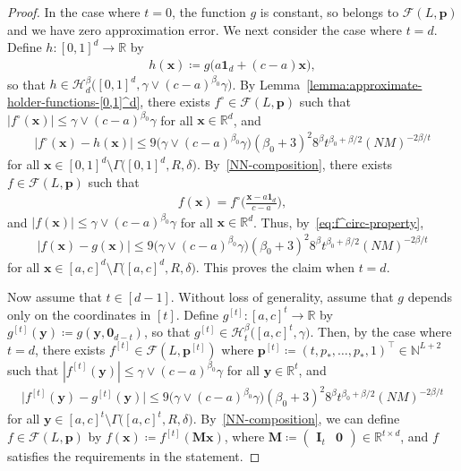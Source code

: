 \documentclass[12pt]{article}
\begin{document}
\begin{proof}
    In the case where $t=0$, the function $g$ is constant, so belongs to $\mathcal{F}(L,\bm p)$ and we have zero approximation error.
    We next consider the case where $t=d$.
    Define $h:[0,1]^d \to \mathbb{R}$ by
    \begin{align*}
        h(\bm x) \coloneqq g\bigl(a\bm{1}_d + (c-a)\bm x  \bigr),
    \end{align*}
    so that $h\in\mathcal{H}_d^{\beta}\bigl([0,1]^d, \gamma \vee (c-a)^{\beta_0}\gamma\bigr)$. By Lemma~\ref{lemma:approximate-holder-functions-[0,1]^d}, there exists $f^\circ \in\mathcal{F}(L,\bm p)$ such that $|f^\circ(\bm x)| \leq \gamma \vee (c-a)^{\beta_0}\gamma$ for all $\bm x \in \mathbb{R}^d$, and
    \begin{align}
        |f^\circ(\bm x) - h(\bm x)| \leq 9 \bigl(\gamma \vee (c-a)^{\beta_0}\gamma\bigr) (\beta_0+3)^2 8^{\beta} t^{\beta_0+\beta/2} (NM)^{-2\beta/t} \label{eq:f^circ-property}
    \end{align}
    for all $\bm x \in [0,1]^d \setminus \Gamma \bigl([0,1]^d,R,\delta\bigr)$. 
    By~\ref{NN-composition}, there exists $f \in \mathcal{F}(L,\bm p)$ such that 
    \begin{align*}
        f(\bm x) = f^\circ\biggl(\frac{\bm x - a\bm{1}_d}{c-a}\biggr),
    \end{align*}
    and $|f(\bm x)| \leq \gamma \vee (c-a)^{\beta_0}\gamma$ for all $\bm x \in \mathbb{R}^d$.
    Thus, by~\eqref{eq:f^circ-property},
    \begin{align*}
        |f(\bm x) - g(\bm x)| \leq 9 \bigl(\gamma \vee (c-a)^{\beta_0}\gamma\bigr) (\beta_0+3)^2 8^{\beta} t^{\beta_0+\beta/2} (NM)^{-2\beta/t}
    \end{align*}
    for all $\bm x \in [a,c]^d \setminus \Gamma\bigl([a,c]^d, R, \delta\bigr)$. This proves the claim when $t=d$.

    \medskip Now assume that $t\in[d-1]$. Without loss of generality, assume that $g$ depends only on the coordinates in $[t]$. Define $g^{[t]} : [a,c]^t \to \mathbb{R}$ by $g^{[t]}(\bm y) \coloneqq g(\bm y, \bm 0_{d-t})$, so that $g^{[t]} \in \mathcal{H}_t^{\beta}\bigl([a,c]^t, \gamma\bigr)$. Then, by the case where $t=d$, there exists $f^{[t]} \in \mathcal{F}(L, \bm p^{[t]})$ where $\bm p^{[t]} \coloneqq (t,p_*,\ldots,p_*,1)^\top \in \mathbb{N}^{L+2}$ such that $|f^{[t]}(\bm y)| \leq \gamma \vee (c-a)^{\beta_0}\gamma$ for all $\bm y\in \mathbb{R}^t$, and
    \begin{align*}
        \bigl|f^{[t]}(\bm y) - g^{[t]}(\bm y)\bigr| \leq 9 \bigl(\gamma \vee (c-a)^{\beta_0}\gamma\bigr) (\beta_0+3)^2 8^{\beta} t^{\beta_0+\beta/2} (NM)^{-2\beta/t}
    \end{align*}
    for all $\bm y \in [a,c]^t \setminus \Gamma\bigl([a,c]^t, R, \delta\bigr)$. By~\ref{NN-composition}, we can define $f\in\mathcal{F}(L,\bm p)$ by $f(\bm x) \coloneqq f^{[t]}(\bm M \bm x)$, where $\bm M \coloneqq \begin{pmatrix}
        \bm I_t & \bm 0
    \end{pmatrix} \in \mathbb{R}^{t \times d}$, and $f$ satisfies the requirements in the statement.
\end{proof}
\end{document}
